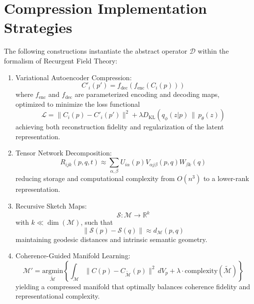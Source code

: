 \section{Compression Implementation Strategies}

The following constructions instantiate the abstract operator \(\mathcal{D}\) within the formalism of Recurgent Field Theory:

\begin{enumerate}
    \item Variational Autoencoder Compression:
    \begin{equation}
    C'_i(p') = f_{\mathrm{dec}}(f_{\mathrm{enc}}(C_i(p)))
    \end{equation}
    where \(f_{\mathrm{enc}}\) and \(f_{\mathrm{dec}}\) are parameterized encoding and decoding maps, optimized to minimize the loss functional
    \begin{equation}
    \mathcal{L} = \|C_i(p) - C'_i(p')\|^2 + \lambda D_{\mathrm{KL}}(q_{\phi}(z|p) \,\|\, p_{\theta}(z))
    \end{equation}
    achieving both reconstruction fidelity and regularization of the latent representation.

    \item Tensor Network Decomposition:
    \begin{equation}
    R_{ijk}(p,q,t) \approx \sum_{\alpha, \beta} U_{i\alpha}(p) V_{\alpha j\beta}(p,q) W_{\beta k}(q)
    \end{equation}
    reducing storage and computational complexity from \(O(n^3)\) to a lower-rank representation.

    \item Recursive Sketch Maps:
    \begin{equation}
    \mathcal{S}: \mathcal{M} \to \mathbb{R}^k
    \end{equation}
    with \(k \ll \dim(\mathcal{M})\), such that
    \begin{equation}
    \|\mathcal{S}(p) - \mathcal{S}(q)\| \approx d_{\mathcal{M}}(p, q)
    \end{equation}
    maintaining geodesic distances and intrinsic semantic geometry.

    \item Coherence-Guided Manifold Learning:
    \begin{equation}
    \mathcal{M}' = \underset{\tilde{\mathcal{M}}}{\mathrm{argmin}} \left\{ \int_{\mathcal{M}} \|C(p) - C_{\tilde{\mathcal{M}}}(p)\|^2 \, dV_p + \lambda \cdot \mathrm{complexity}(\tilde{\mathcal{M}}) \right\}
    \end{equation}
    yielding a compressed manifold that optimally balances coherence fidelity and representational complexity.
\end{enumerate}

